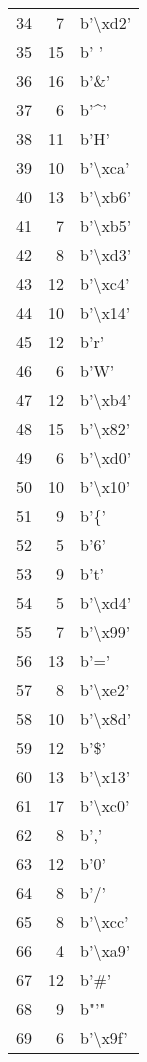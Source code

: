 \begin{tabular}{lrl}
34  &    7 &  b'\textbackslash xd2' \\
35  &   15 &     b' ' \\
36  &   16 &     b'\&' \\
37  &    6 &     b'\textasciicircum ' \\
38  &   11 &     b'H' \\
39  &   10 &  b'\textbackslash xca' \\
40  &   13 &  b'\textbackslash xb6' \\
41  &    7 &  b'\textbackslash xb5' \\
42  &    8 &  b'\textbackslash xd3' \\
43  &   12 &  b'\textbackslash xc4' \\
44  &   10 &  b'\textbackslash x14' \\
45  &   12 &     b'r' \\
46  &    6 &     b'W' \\
47  &   12 &  b'\textbackslash xb4' \\
48  &   15 &  b'\textbackslash x82' \\
49  &    6 &  b'\textbackslash xd0' \\
50  &   10 &  b'\textbackslash x10' \\
51  &    9 &     b'\{' \\
52  &    5 &     b'6' \\
53  &    9 &     b't' \\
54  &    5 &  b'\textbackslash xd4' \\
55  &    7 &  b'\textbackslash x99' \\
56  &   13 &     b'=' \\
57  &    8 &  b'\textbackslash xe2' \\
58  &   10 &  b'\textbackslash x8d' \\
59  &   12 &     b'\$' \\
60  &   13 &  b'\textbackslash x13' \\
61  &   17 &  b'\textbackslash xc0' \\
62  &    8 &     b',' \\
63  &   12 &     b'0' \\
64  &    8 &     b'/' \\
65  &    8 &  b'\textbackslash xcc' \\
66  &    4 &  b'\textbackslash xa9' \\
67  &   12 &     b'\#' \\
68  &    9 &     b"'" \\
69  &    6 &  b'\textbackslash x9f' \\

\end{tabular}
